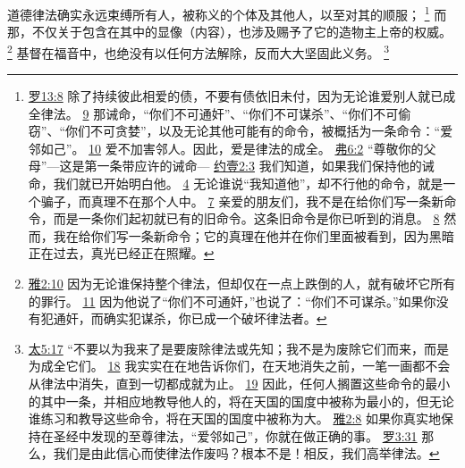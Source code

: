 \documentclass[12pt, a4paper, oneside]{ctexart}
\newcounter{parnum}[section]
\newcommand{\N}{%
   \noindent\refstepcounter{parnum}%
    \makebox[\parindent][l]{\textbf{\arabic{parnum}.}}}
\begin{document}
\N 道德律法确实永远束缚所有人，被称义的个体及其他人，以至对其的顺服；
	\footnote {
		\href{https://biblehub.com/romans/13-8.htm}{罗13:8} 除了持续彼此相爱的债，不要有债依旧未付，因为无论谁爱别人就已成全律法。
		\href{https://biblehub.com/romans/13-9.htm}{9} 那诫命，“你们不可通奸”、“你们不可谋杀”、“你们不可偷窃”、“你们不可贪婪”，以及无论其他可能有的命令，被概括为一条命令：“爱邻如己”。
		\href{https://biblehub.com/romans/13-10.htm}{10} 爱不加害邻人。因此，爱是律法的成全。
		\href{https://biblehub.com/ephesians/6-2.htm}{弗6:2} “尊敬你的父母”---这是第一条带应许的诫命---
		\href{https://biblehub.com/1_john/2-3.htm}{约壹2:3} 我们知道，如果我们保持他的诫命，我们就已开始明白他。
		\href{https://biblehub.com/1_john/2-4.htm}{4} 无论谁说“我知道他”，却不行他的命令，就是一个骗子，而真理不在那个人中。
		\href{https://biblehub.com/1_john/2-7.htm}{7} 亲爱的朋友们，我不是在给你们写一条新命令，而是一条你们起初就已有的旧命令。这条旧命令是你已听到的消息。
		\href{https://biblehub.com/1_john/2-8.htm}{8} 然而，我在给你们写一条新命令；它的真理在他并在你们里面被看到，因为黑暗正在过去，真光已经正在照耀。
	}
	而那，不仅关于包含在其中的显像（内容），也涉及赐予了它的造物主上帝的权威。
	\footnote {
		\href{https://biblehub.com/james/2-10.htm}{雅2:10} 因为无论谁保持整个律法，但却仅在一点上跌倒的人，就有破坏它所有的罪行。
		\href{https://biblehub.com/james/2-11.htm}{11} 因为他说了“你们不可通奸，”也说了：“你们不可谋杀。”如果你没有犯通奸，而确实犯谋杀，你已成一个破坏律法者。
	}
	基督在福音中，也绝没有以任何方法解除，反而大大坚固此义务。
	\footnote {
		\href{https://biblehub.com/matthew/5-17.htm}{太5:17} “不要以为我来了是要废除律法或先知；我不是为废除它们而来，而是为成全它们。
		\href{https://biblehub.com/matthew/5-18.htm}{18} 我实实在在地告诉你们，在天地消失之前，一笔一画都不会从律法中消失，直到一切都成就为止。
		\href{https://biblehub.com/matthew/5-19.htm}{19} 因此，任何人搁置这些命令的最小的其中一条，并相应地教导他人的，将在天国的国度中被称为最小的，但无论谁练习和教导这些命令，将在天国的国度中被称为大。
		\href{https://biblehub.com/james/2-8.htm}{雅2:8} 如果你真实地保持在圣经中发现的至尊律法，“爱邻如己”，你就在做正确的事。
		\href{https://biblehub.com/romans/3-31.htm}{罗3:31} 那么，我们是由此信心而使律法作废吗？根本不是！相反，我们高举律法。
	}
\end{document}
